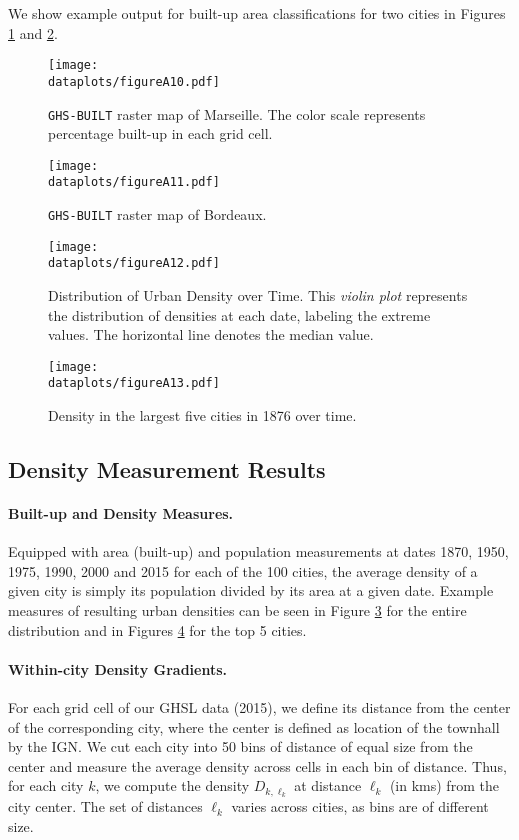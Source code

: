 \documentclass[11pt]{report}
\newcommand{\dataplots}{../output/data/plots}
\begin{document}
We show example output for built-up area classifications for two cities in Figures \ref{A-fig:built-marseille} and \ref{A-fig:built-bordeaux}. 

\begin{figure}
	\centering
	\texttt{[image: \\dataplots/figureA10.pdf]}
	\caption{\texttt{GHS-BUILT} raster map of Marseille. The color scale represents percentage built-up in each grid cell.\label{A-fig:built-marseille}}
\end{figure}


\begin{figure}
	\centering
	\texttt{[image: \\dataplots/figureA11.pdf]}
	\caption{\texttt{GHS-BUILT} raster map of Bordeaux.\label{A-fig:built-bordeaux}}
\end{figure}


\begin{figure}
	\texttt{[image: \\dataplots/figureA12.pdf]}
	\caption{Distribution of Urban Density over Time. This \emph{violin plot} represents the distribution of densities at each date, labeling the extreme values. The horizontal line denotes the median value.\label{A-fig:density-dist}}
\end{figure}

\begin{figure}
	\texttt{[image: \\dataplots/figureA13.pdf]}
	\caption{Density in the largest five cities in 1876 over time.\label{A-fig:density-top5}}
\end{figure}



\subsection{Density Measurement Results}\label{A-sec:density-results}


\paragraph{Built-up and Density Measures.} Equipped with area (built-up) and population measurements at dates 1870, 1950, 1975, 1990, 2000 and 2015 for each of the 100 cities, the average density of a given city is simply its population divided by its area at a given date. Example measures of resulting urban densities can be seen in Figure \ref{A-fig:density-dist} for the entire distribution and in Figures \ref{A-fig:density-top5} for the top 5 cities.

\paragraph{Within-city Density Gradients.} For each grid cell of our GHSL data (2015), we define its distance from the center of the corresponding city, where the center is defined as location of the townhall by the IGN. We cut each city into 50 bins of distance of equal size from the center and measure the average density across cells in each bin of distance. Thus, for each city $k$, we compute the density $D_{k,\ell_k}$ at distance $\ell_k$ (in kms) from the city center. The set of distances $\ell_k$ varies across cities, as bins are of different size.
\end{document}
